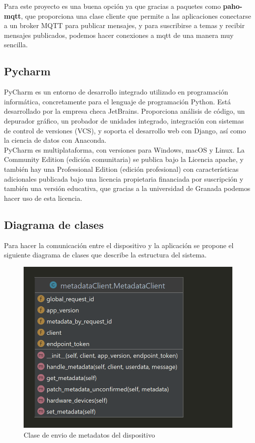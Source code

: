 Para este proyecto es una buena opción ya que gracias a paquetes como \textbf{paho-mqtt}, que proporciona una clase cliente que permite a las aplicaciones conectarse a un broker MQTT para publicar mensajes, y para suscribirse a temas y recibir mensajes publicados, podemos hacer conexiones a mqtt de una manera muy sencilla. \cite{paho-mqtt}

\subsection{Pycharm}

PyCharm es un entorno de desarrollo integrado utilizado en programación informática, concretamente para el lenguaje de programación Python. Está desarrollado por la empresa checa JetBrains. Proporciona análisis de código, un depurador gráfico, un probador de unidades integrado, integración con sistemas de control de versiones (VCS), y soporta el desarrollo web con Django, así como la ciencia de datos con Anaconda. \\

PyCharm es multiplataforma, con versiones para Windows, macOS y Linux. La Community Edition (edición comunitaria) se publica bajo la Licencia apache, y también hay una Professional Edition (edición profesional) con características adicionales publicada bajo una licencia propietaria financiada por suscripción y también una versión educativa, que gracias a la universidad de Granada podemos hacer uso de esta licencia. \cite{pycharm}

\subsection{Diagrama de clases}

Para hacer la comunicación entre el dispositivo y la aplicación se propone el siguiente diagrama de clases que describe la estructura del sistema. 

\begin{figure}[p]
    \centering
    \includegraphics[width=\linewidth]{imagenes/metadataClient.png}
    \caption{Clase de envio de metadatos del dispositivo}
    \label{fig:figure-diseño1}
\end{figure}

